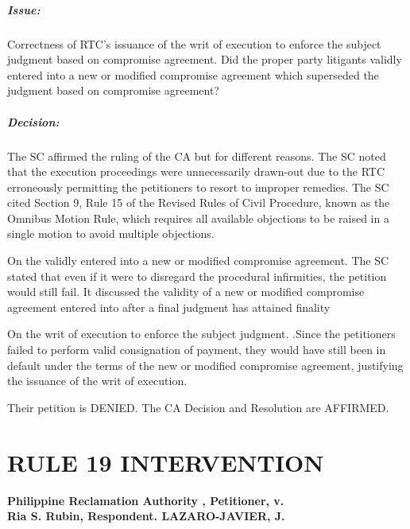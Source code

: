 \documentclass[
12pt,
oneside,
onehalfspacing,
headsepline
]{DigestCollection}
\begin{document}
\paragraph{Issue:}
\label{c5d4d3d0-09fd-11ef-932c-63c852f65e48}


Correctness of RTC's issuance of the writ of execution to enforce the subject judgment based on compromise agreement. Did the proper party litigants validly entered into a new or modified compromise agreement which superseded the judgment based on compromise agreement? 

\paragraph{Decision:}
\label{c7e2cc40-09fd-11ef-932c-63c852f65e48}


The SC affirmed the ruling of the CA but for different reasons. The SC noted that the execution proceedings were unnecessarily drawn-out due to the RTC erroneously permitting the petitioners to resort to improper remedies. The SC cited Section 9, Rule 15 of the Revised Rules of Civil Procedure, known as the Omnibus Motion Rule, which requires all available objections to be raised in a single motion to avoid multiple objections.

On the validly entered into a new or modified compromise agreement. The SC stated that even if it were to disregard the procedural infirmities, the petition would still fail. It discussed the validity of a new or modified compromise agreement entered into after a final judgment has attained finality

On the writ of execution to enforce the subject judgment. .Since the petitioners failed to perform valid consignation of payment, they would have still been in default under the terms of the new or modified compromise agreement, justifying the issuance of the writ of execution.

Their petition is DENIED. The CA Decision and Resolution are AFFIRMED.

\chapter{RULE 19 INTERVENTION }
\label{226c80c0-0a12-11ef-932c-63c852f65e48}


\label{fbd5e160-0a0f-11ef-932c-63c852f65e48}


\noindent\textbf{Philippine Reclamation Authority , Petitioner, v. \\Ria S. Rubin, Respondent. LAZARO-JAVIER, J.}\vspace{0.4cm}
\end{document}
